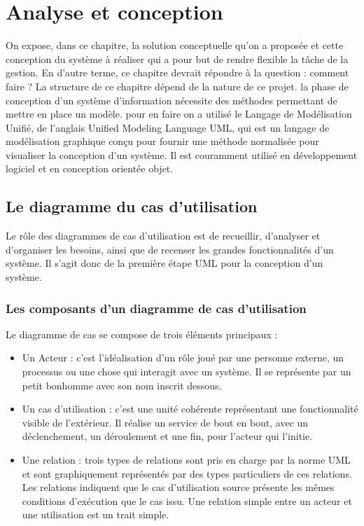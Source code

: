 \chapter{Analyse et conception}

On expose, dans ce chapitre, la solution conceptuelle qu'on a proposée et cette conception du système à réaliser qui a pour but de rendre flexible la tâche de la gestion. En d’autre terme, ce chapitre devrait répondre à la question : comment faire ? La structure de ce chapitre dépend de la nature de ce projet. la phase de conception d’un système d’information nécessite des méthodes permettant de mettre en place un modèle. pour en faire on a utilisé le Langage de Modélisation Unifié, de l'anglais Unified Modeling Language UML, qui est un langage de modélisation graphique conçu pour fournir une méthode normalisée pour visualiser la conception d'un système. Il est couramment utilisé en développement logiciel et en conception orientée objet.

\section{Le diagramme du cas d’utilisation}

Le rôle des diagrammes de cas d’utilisation est de recueillir, d’analyser et d’organiser les besoins, ainsi que de recenser les grandes fonctionnalités d’un système. Il s’agit donc de la première étape UML pour la conception d’un système.

\subsection{Les composants d'un diagramme de cas d'utilisation}

Le diagramme de cas se compose de trois éléments principaux :
\bigbreak
\begin{itemize}
\item Un Acteur : c’est l’idéalisation d’un rôle joué par une personne externe, un processus ou une chose qui interagit avec un système. Il se représente par un petit bonhomme avec son nom inscrit dessous.
\item Un cas d’utilisation : c’est une unité cohérente représentant une fonctionnalité visible de l’extérieur. Il réalise un service de bout en bout, avec un déclenchement, un déroulement et une fin, pour l’acteur qui l’initie.
\item Une relation : trois types de relations sont pris en charge par la norme UML et sont graphiquement représentés par des types particuliers de ces relations. Les relations indiquent que le cas d'utilisation source présente les mêmes conditions d'exécution que le cas issu. Une relation simple entre un acteur et une utilisation est un trait simple.
\end{itemize}


